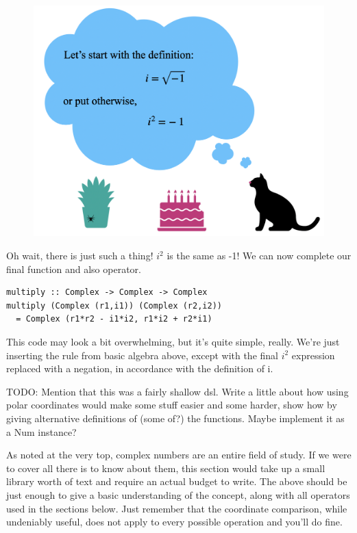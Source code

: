 \begin{figure}[h!]
    \centering
    \includegraphics[scale= 0.4]{catretrospective.png}
    \caption{}
    \label{catretro}
\end{figure}

Oh wait, there is just such a thing! $i^2$ is the same as -1! We can now complete our final function and also operator.

\begin{verbatim}
multiply :: Complex -> Complex -> Complex
multiply (Complex (r1,i1)) (Complex (r2,i2))
  = Complex (r1*r2 - i1*i2, r1*i2 + r2*i1)
\end{verbatim}
This code may look a bit overwhelming, but it's quite simple, really. We're just inserting the rule from basic algebra above, except with the final $i^2$ expression replaced with a negation, in accordance with the definition of i.

\vspace{1cm}

TODO: Mention that this was a fairly shallow dsl. Write a little about how using polar coordinates would make some stuff easier and some harder, show how by giving alternative definitions of (some of?) the functions. Maybe implement it as a Num instance? 

As noted at the very top, complex numbers are an entire field of study. If we were to cover all there is to know about them, this section would take up a small library worth of text and require an actual budget to write. The above should be just enough to give a basic understanding of the concept, along with all operators used in the sections below. Just remember that the coordinate comparison, while undeniably useful, does not apply to every possible operation and you'll do fine.

